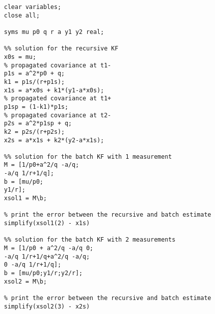 \begin{verbatim}
clear variables;
close all;

syms mu p0 q r a y1 y2 real;

%% solution for the recursive KF
x0s = mu;
% propagated covariance at t1-
p1s = a^2*p0 + q;
k1 = p1s/(r+p1s);
x1s = a*x0s + k1*(y1-a*x0s);
% propagated covariance at t1+
p1sp = (1-k1)*p1s;
% propagated covariance at t2-
p2s = a^2*p1sp + q;
k2 = p2s/(r+p2s);
x2s = a*x1s + k2*(y2-a*x1s);

%% solution for the batch KF with 1 measurement
M = [1/p0+a^2/q -a/q;
-a/q 1/r+1/q];
b = [mu/p0;
y1/r];
xsol1 = M\b;

% print the error between the recursive and batch estimate
simplify(xsol1(2) - x1s)

%% solution for the batch KF with 2 measurements
M = [1/p0 + a^2/q -a/q 0;
-a/q 1/r+1/q+a^2/q -a/q;
0 -a/q 1/r+1/q];
b = [mu/p0;y1/r;y2/r];
xsol2 = M\b;

% print the error between the recursive and batch estimate
simplify(xsol2(3) - x2s)
\end{verbatim}